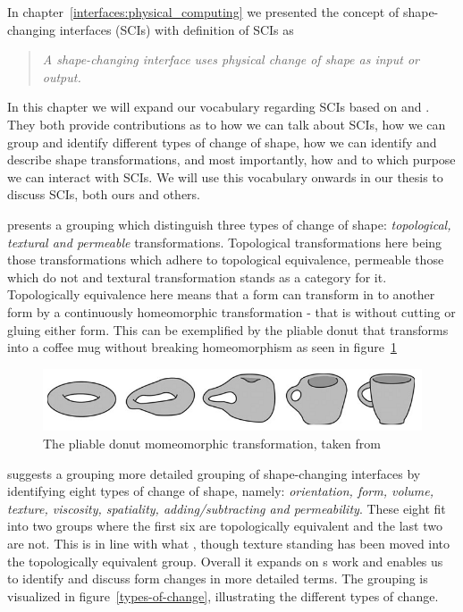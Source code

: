 \label{ch:jamming:vocabulary}
In chapter~\ref{interfaces:physical_computing} we presented the concept of shape-changing interfaces (SCIs) with \citeauthor{rasmussen2012shape} definition of SCIs as

\begin{quotation}
  \emph{A shape-changing interface uses physical change of shape as input or output. \citep{rasmussen2012shape}} 
\end{quotation}
In this chapter we will expand our vocabulary regarding SCIs based on \citet{coelho2011shape} and \citet{rasmussen2012shape}.
They both provide contributions as to how we can talk about SCIs, how we can group and identify different types of change of shape, how we can identify and describe shape transformations, and most importantly, how and to which purpose we can interact with SCIs.
We will use this vocabulary onwards in our thesis to discuss SCIs, both ours and others.   

\citeauthor{coelho2011shape} presents a grouping which distinguish three types of change of shape: \emph{topological, textural and permeable} transformations.
Topological transformations here being those transformations which adhere to topological equivalence, permeable those which do not and textural transformation stands as a category for it.
Topologically equivalence here means that a form can transform in to another form by a continuously homeomorphic transformation - that is without cutting or gluing either form.
This can be exemplified by the pliable donut that transforms into a coffee mug without breaking homeomorphism as seen in figure~\ref{pliable-mug} 

\begin{figure}[h]
  \centering
  \includegraphics[width=0.9\linewidth]{figures/pliable-donut}
	\caption{The pliable donut momeomorphic transformation, taken from \citep{coelho2011shape}}
   \label{pliable-mug}
\end{figure}   
 
\citeauthor{rasmussen2012shape} suggests a grouping more detailed grouping of shape-changing interfaces by identifying eight types of change of shape, namely: \textit{orientation, form, volume, texture, viscosity, spatiality, adding/subtracting and permeability}.
These eight fit into two groups where the first six are topologically equivalent and the last two are not.
This is in line with what \citeauthor{coelho2011shape}, though texture standing has been moved into the topologically equivalent group. Overall it expands on \citeauthor{coelho2011shape}s work and enables us to identify and discuss form changes in more detailed terms.
The grouping is visualized in figure~\ref{types-of-change}, illustrating the different types of change.

